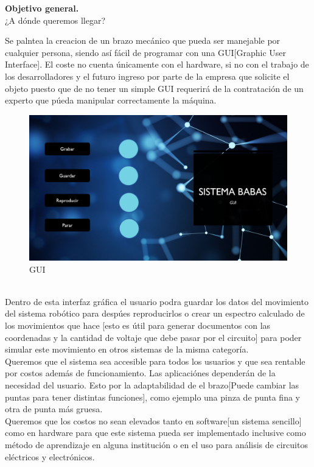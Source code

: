\documentclass[letterpaper]{article}
\begin{document}
\begin{large}
    \begin{LARGE}
        \textbf{Objetivo general.}\\
       
       
        ¿A dónde queremos llegar?\\
     
         
    \end{LARGE}
        Se palntea la creacion de un brazo mecánico que pueda ser manejable por cualquier persona, siendo así fácil de programar con una GUI[Graphic User Interface]. El coste no cuenta únicamente con el hardware, si no con el trabajo de los desarrolladores y el futuro ingreso por parte de la empresa que solicite el objeto puesto que de no tener un simple GUI requerirá de la contratación de un experto que púeda manipular correctamente la máquina.\\
 \vspace{.6cm}
        \begin{figure}[htbp]
            \centering
            \includegraphics[scale=0.2]{Img/babas.jpeg}
            \caption{GUI}
            \label{fig:gui}
        \end{figure}\\
    Dentro de esta interfaz gráfica el usuario podra guardar los datos del movimiento del sistema robótico para despúes reproducirlos o crear un espectro calculado de los movimientos que hace [esto es útil para generar documentos con las coordenadas y la cantidad de voltaje que debe pasar por el circuito] para poder simular este movimiento en otros sistemas de la misma categoría. \\
    Queremos que el sistema sea accesible para todos los usuarios y que sea rentable por costos además de funcionamiento. Las aplicaciónes dependerán de la necesidad del usuario. Esto por la adaptabilidad de el brazo[Puede cambiar las puntas para tener distintas funciones], como ejemplo una pinza de punta fina y otra de punta más gruesa.\\
    Queremos que los costos no sean elevados tanto en software[un sistema sencillo] como en hardware  para que este sistema pueda ser implementado inclusive como método de aprendizaje en alguna institución o en el uso para análisis de circuitos eléctricos y electrónicos.\\\\
        
\end{large}
\end{document}
